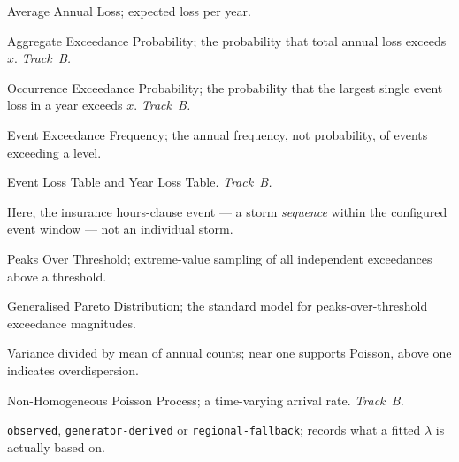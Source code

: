 \documentclass[11pt]{article}
\begin{document}
\begin{description}[nosep,style=nextline]
  \item[AAL] Average Annual Loss; expected loss per year.
  \item[AEP] Aggregate Exceedance Probability; the probability that total annual
        loss exceeds $x$. \emph{Track~B.}
  \item[OEP] Occurrence Exceedance Probability; the probability that the largest
        single event loss in a year exceeds $x$. \emph{Track~B.}
  \item[EEF] Event Exceedance Frequency; the annual frequency, not probability,
        of events exceeding a level.
  \item[ELT / YLT] Event Loss Table and Year Loss Table. \emph{Track~B.}
  \item[Event] Here, the insurance hours-clause event --- a storm \emph{sequence}
        within the configured event window --- not an individual storm.
  \item[POT] Peaks Over Threshold; extreme-value sampling of all independent
        exceedances above a threshold.
  \item[GPD] Generalised Pareto Distribution; the standard model for
        peaks-over-threshold exceedance magnitudes.
  \item[Dispersion index] Variance divided by mean of annual counts; near one
        supports Poisson, above one indicates overdispersion.
  \item[NHPP] Non-Homogeneous Poisson Process; a time-varying arrival rate.
        \emph{Track~B.}
  \item[Provenance class] \texttt{observed}, \texttt{generator-derived} or
        \texttt{regional-fallback}; records what a fitted $\lambda$ is actually
        based on.
\end{description}
\end{document}
